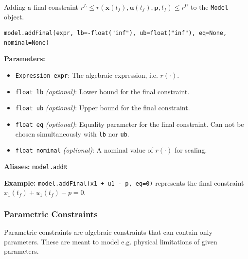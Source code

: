 \documentclass[12pt]{article}
\renewcommand{\v}{\bm}
\begin{document}
	\begin{mdframed}[backgroundcolor=gray!10, roundcorner=10pt, linewidth=1pt]
		
		Adding a final constraint ${r}^{L} \leq {r}(\v{x}(t_f), \v{u}(t_f), \v{p}, t_f) \leq {r}^{U}$ to the \texttt{Model} object.
		
		\begin{lstlisting}
model.addFinal(expr, lb=-float("inf"), ub=float("inf"), eq=None, nominal=None)
		\end{lstlisting}
		\label{addFinal}
		\textbf{Parameters:}
		\begin{itemize}
			\item \texttt{Expression expr}: The algebraic expression, i.e. $r(\cdot)$.
			\item \texttt{float lb} \emph{(optional)}: Lower bound for the final constraint.
			\item \texttt{float ub} \emph{(optional)}: Upper bound for the final constraint.
			\item \texttt{float eq} \emph{(optional)}: Equality parameter for the final constraint. Can not be chosen simultaneously with \texttt{lb} nor \texttt{ub}.
			\item \texttt{float nominal} \emph{(optional)}: A nominal value of $r(\cdot)$ for scaling.
		\end{itemize}
		
		\textbf{Aliases:}  \texttt{model.addR}
		
		\textbf{Example:} \texttt{model.addFinal(x1 + u1 - p, eq=0)} represents the final constraint
		$x_1(t_f) + u_1(t_f) - p = 0$.
	\end{mdframed}
	
	\subsubsection{Parametric Constraints}
	
		Parametric constraints are algebraic constraints that can contain only parameters. These are meant to model e.g. physical limitations of given parameters.
	
\end{document}
